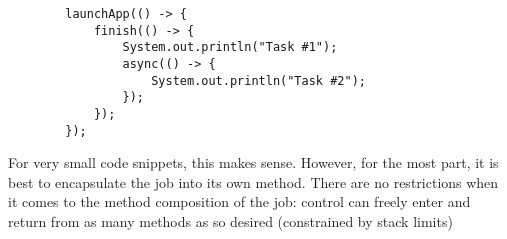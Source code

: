 \documentclass[12pt]{article}
\begin{document}
    \begin{lstlisting}
        launchApp(() -> {
            finish(() -> {
                System.out.println("Task #1");
                async(() -> {
                    System.out.println("Task #2");
                });
            });
        });
    \end{lstlisting}

    For very small code snippets, this makes sense. However, for the most part, it is best to encapsulate the
    job into its own method. There are no restrictions when it comes to the method composition of the job:
    control can freely enter and return from as many methods as so desired (constrained by stack limits)
\end{document}
